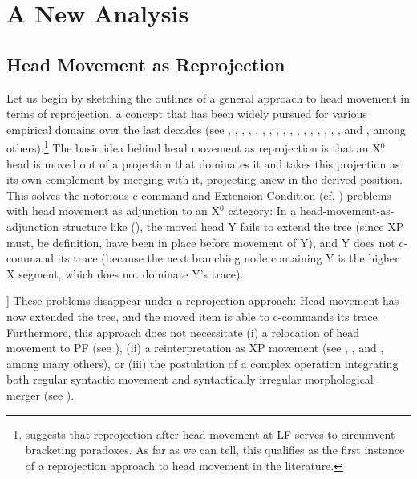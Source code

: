 \documentclass[output=paper
,modfonts
,nonflat]{langsci/langscibook}
\begin{document}
\section{A New Analysis}

\subsection{Head Movement as Reprojection}

Let us begin by sketching the outlines of a general approach to head
movement in terms of reprojection, a concept that has been widely
pursued for various empirical domains over the last decades (see
\cite{Pesetsky:85}, \cite{Stechow&Sternefeld:88},
\cite{Sternefeld:89}, \cite{Holmberg:91}, \cite{Ackemaetal:93},
\cite{Kiss:95}, \cite{Koeneman:00}, \cite{Haider:00:bra},
\cite{Bhatt:02}, \cite{Hornstein&Uriagereka:02},
\cite{Fanselow:03,Fanselow:09:boo}, \cite{Bury:03}, \cite{Suranyi:05},
\cite{Donati:06}, \cite{Bayer&Brandner:08},
\cite{Georgi&Mueller:10:rep}, \cite{Mueller:11:loc}, and
, among others).\footnote{\cite{Pesetsky:85}
  suggests that reprojection after head movement at LF serves to
  circumvent bracketing paradoxes. As far as we can tell, this
  qualifies as the first instance of a reprojection approach to head
  movement in the literature.} The basic idea behind head movement as
reprojection is that an X$^0$ head is moved out of a projection that dominates it 
and takes this projection as its own complement by merging with it,
  projecting anew in the derived position. This solves the notorious
  c-command and Extension Condition (cf. \cite{Chomsky:95}) problems with head movement as
  adjunction to an X$^0$ category: In a head-movement-as-adjunction structure like (\Next),
the moved head Y fails to extend the tree (since XP must, be
definition, have been in place before movement of Y), and Y does not
c-command its trace (because the next branching node containing Y is
the higher X segment, which does not dominate Y's trace).

\ea\label{ex:mueller:23}\relax [XP [X Y$\_$1 X~] [WP ... t$\_$1 ...~]]\z
These problems disappear under a reprojection approach:  Head movement has now extended the
  tree, and the moved item is able to c-commands its
  trace. Furthermore, this approach does not 
  necessitate (i) a relocation of head movement to PF (see
  \cite{Chomsky:00}), (ii) a
  reinterpretation as XP movement (see \cite{Koopman&Szabolcsi:00}, \cite{Mahajan:01},
  and \cite{Nilsen:03:diss}, among many others), or (iii) the
  postulation of a complex
  operation integrating both regular syntactic movement and
  syntactically irregular morphological merger (see
  \cite{Matushansky:06}). 
\end{document}
